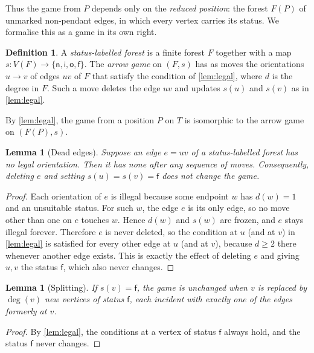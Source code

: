 \documentclass[11pt]{amsart}
\newtheorem{lemma}[theorem]{Lemma}
\theoremstyle{definition}
\newtheorem{definition}[theorem]{Definition}
\theoremstyle{remark}
\newcommand{\sn}{\mathsf{n}}
\newcommand{\si}{\mathsf{i}}
\newcommand{\so}{\mathsf{o}}
\newcommand{\sff}{\mathsf{f}}
\begin{document}
Thus the game from $P$ depends only on the \emph{reduced position}: the forest $F(P)$ of unmarked non-pendant edges, in which every vertex carries its status. We formalise this as a game in its own right.

\begin{definition}\label{def:labelledgame}
A \emph{status-labelled forest} is a finite forest $F$ together with a map $s\colon V(F)\to\{\sn,\si,\so,\sff\}$. The \emph{arrow game} on $(F,s)$ has as moves the orientations $u\to v$ of edges $uv$ of $F$ that satisfy the condition of \cref{lem:legal}, where $d$ is the degree in $F$. Such a move deletes the edge $uv$ and updates $s(u)$ and $s(v)$ as in \cref{lem:legal}.
\end{definition}

By \cref{lem:legal}, the game from a position $P$ on $T$ is isomorphic to the arrow game on $(F(P),s)$.

\begin{lemma}[Dead edges]\label{lem:dead}
Suppose an edge $e=uv$ of a status-labelled forest has no legal orientation. Then it has none after any sequence of moves. Consequently, deleting $e$ and setting $s(u)=s(v)=\sff$ does not change the game.
\end{lemma}

\begin{proof}
Each orientation of $e$ is illegal because some endpoint $w$ has $d(w)=1$ and an unsuitable status. For such $w$, the edge $e$ is its only edge, so no move other than one on $e$ touches $w$. Hence $d(w)$ and $s(w)$ are frozen, and $e$ stays illegal forever. Therefore $e$ is never deleted, so the condition at $u$ (and at $v$) in \cref{lem:legal} is satisfied for every other edge at $u$ (and at $v$), because $d\ge2$ there whenever another edge exists. This is exactly the effect of deleting $e$ and giving $u,v$ the status $\sff$, which also never changes.
\end{proof}

\begin{lemma}[Splitting]\label{lem:split}
If $s(v)=\sff$, the game is unchanged when $v$ is replaced by $\deg(v)$ new vertices of status $\sff$, each incident with exactly one of the edges formerly at $v$.
\end{lemma}

\begin{proof}
By \cref{lem:legal}, the conditions at a vertex of status $\sff$ always hold, and the status $\sff$ never changes.
\end{proof}
\end{document}

